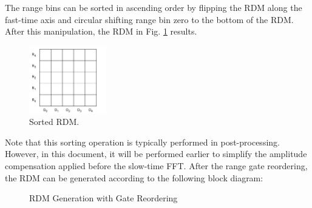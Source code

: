 \documentclass[conference]{IEEEtran}
\begin{document}
The range bins can be sorted in ascending order by flipping the RDM along the fast-time axis and circular shifting range bin zero to the bottom of the RDM. After this manipulation, the RDM in Fig. \ref{Sorted_RDM} results.
\begin{figure}[H]
\centerline{\includegraphics[width=0.3\textwidth]{Sorted_RDM.png}}
\caption{Sorted RDM.}
\label{Sorted_RDM}
\end{figure}
Note that this sorting operation is typically performed in post-processing. However, in this document, it will be performed earlier to simplify the amplitude compensation applied before the slow-time FFT. After the range gate reordering, the RDM can be generated according to the following block diagram:
\begin{figure}[H]
\centerline{}
\caption{RDM Generation with Gate Reordering}
\label{RDM_Gate_Reording}
\end{figure}

\end{document}
